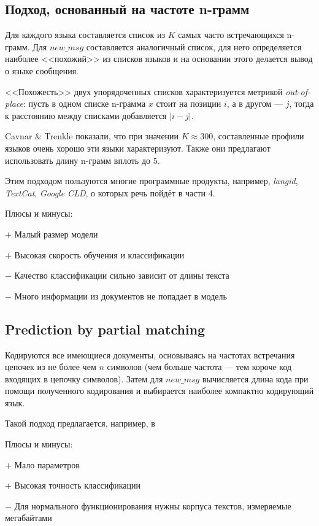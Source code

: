 \documentclass[a4paper, 14pt]{article}
\begin{document}
		\subsection{Подход, основанный на частоте n-грамм}
		Для каждого языка составляется список из $K$ самых часто встречающихся n-грамм. Для $new\_msg$ составляется аналогичный список, для него
		определяется наиболее <<похожий>> из списков языков
		и на основании этого делается вывод о языке сообщения. 
		
		<<Похожесть>> двух упорядоченных списков характеризуется метрикой \textit{out-of-place}: 
		пусть в одном списке n-грамма $x$ стоит на позиции $i$, а в другом \nolinebreak --- $j$, тогда к расстоянию между списками добавляется $|i - j|$.
		
		
		Cavnar \& Trenkle показали, что при значении $K \approx 300$, составленные 
		профили языков очень хорошо эти языки характеризуют. Также они предлагают использовать длину n-грамм вплоть до 5.
		
		Этим подходом пользуются многие программные продукты, например, \textit{langid}, \textit{TextCat}, \textit{Google CLD}, о которых речь пойдёт
		в части 4.
		
		\noindent Плюсы и минусы:
		
		
		$+$ Малый размер модели
		
		$+$ Высокая скорость обучения и классификации
		
		$-$ Качество классификации сильно зависит от длины текста
		
		$-$ Много информации из документов не попадает в модель
		
		\subsection{Prediction by partial matching}
		Кодируются все имеющиеся документы, основываясь на частотах встречания цепочек из не более чем $n$ символов (чем больше частота --- тем короче
		код входящих в цепочку символов). Затем для $new\_msg$ вычисляется длина кода при помощи полученного кодирования и выбирается наиболее
		компактно кодирующий язык.
		
		Такой подход предлагается, например, в \cite{ppm}
		
		\noindent Плюсы и минусы:
		
		$+$ 	Мало параметров
		
		$+$ Высокая точность классификации
		
		$-$ Для нормального функционирования нужны корпуса текстов, измеряемые мегабайтами
		
\end{document}
